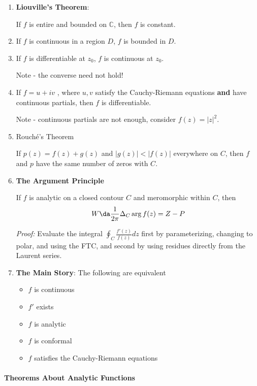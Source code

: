 \begin{enumerate}
\def\labelenumi{\arabic{enumi}.}
\item
  \textbf{Liouville's Theorem}:

  If \(f\) is entire and bounded on \(\mathbb{C}\), then \(f\) is
  constant.
\item
  If \(f\) is continuous in a region \(D\), \(f\) is bounded in \(D\).
\item
  If \(f\) is differentiable at \(z_0\), \(f\) is continuous at \(z_0\).

  Note - the converse need not hold!
\item
  If \(f = u + iv\) , where \(u,v\) satisfy the Cauchy-Riemann equations
  \textbf{and} have continuous partials, then \(f\) is differentiable.

  Note - continuous partials are not enough, consider \(f(z) = |z|^2\).
\item
  Rouché's Theorem

  If \(p(z) = f(z) + g(z)\) and \(|g(z)| < |f(z)|\) everywhere on \(C\),
  then \(f\) and \(p\) have the same number of zeros with \(C\).
\item
  \textbf{The Argument Principle}

  If \(f\) is analytic on a closed contour \(C\) and meromorphic within
  \(C\), then
  \begin{align*}
    W \da \frac{1}{2\pi}\Delta_C \arg f(z) = Z - P
    \end{align*}

  \emph{Proof:} Evaluate the integral \(\oint_C \frac{f'(z)}{f(z)} dz\)
  first by parameterizing, changing to polar, and using the FTC, and
  second by using residues directly from the Laurent series.
\item
  \textbf{The Main Story}: The following are equivalent

  \begin{itemize}
  \item
    \(f\) is continuous
  \item
    \(f'\) exists
  \item
    \(f\) is analytic
  \item
    \(f\) is conformal
  \item
    \(f\) satisfies the Cauchy-Riemann equations
  \end{itemize}
\end{enumerate}

\hypertarget{theorems-about-analytic-functions}{%
\paragraph{Theorems About Analytic
Functions}\label{theorems-about-analytic-functions}}

